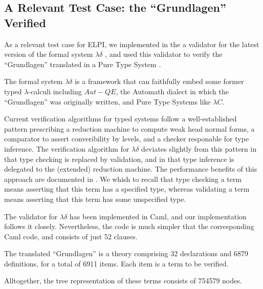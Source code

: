 \subsection{A Relevant Test Case: the ``Grundlagen'' Verified}

As a relevant test case for ELPI,
we implemented in the \frag{}
a validator for the latest version of the formal system $\lambda\delta$
\cite{lambdadeltaJ3a}, and used this validator to verify the
``Grundlagen'' \cite{Jut79} translated in a Pure Type System
\cite{Brn92}.

The formal system $\lambda\delta$ is a framework that can faithfully embed
some former typed $\lambda$-calculi including 
$Aut-QE$, the Automath dialect in which the ``Grundlagen'' was
originally written, and Pure Type Systems like $\lambda C$.

Current verification algorithms for typed systems follow
a well-established pattern prescribing a reduction
machine to compute weak head normal forms, a comparator to assert
converibility by levels, and a checker responable for type inference.
The verification algorithm for $\lambda\delta$ 
deviates slightly from this pattern in that
type checking is replaced by validation, and in that
type inference is delegated to the (extended) reduction machine. 
The performance benefits of this approach are documented in
\cite{lambdadeltaJ3a}.
We whish to recall that type checking a term means 
asserting that this term has a specified type, whereas
validating a term means asserting that this term has 
some unspecified type.

The validator for $\lambda\delta$ has been implemented in Caml,
and our \lp{} implementation follows it closely.
Nevertheless, the \lp{} code is much simpler that the
corresponding Caml code, and consists of just 52 clauses.

The translated ``Grundlagen'' is a theory comprising 
32 declarations and 6879 definitions, for a total of 6911 items.
Each item is a term to be verified.

Alltogether, the tree representation of these terms consists of
754579 nodes.
